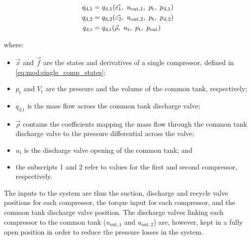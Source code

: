 \begin{equation}
  \begin{split}
    q_{\text{d,1}} & = q_{\text{d,1}}(\vec{\varepsilon_1},\ u_{\text{out},1},\ p_{\text{t}},\ p_{\text{d,1}})\\
    q_{\text{d,2}} & = q_{\text{d,2}}(\vec{\varepsilon_2},\ u_{\text{\text{out}},2},\ p_{\text{t}},\ p_{\text{d,2}})\\
    q_{\text{d,t}} & = q_{\text{d,t}}(\vec{\rho},\ u_{\text{t}},\ p_\text{t},\ p_{\text{out}})
  \end{split}
\end{equation}

where:

\begin{itemize}
  \item $\vec{x}$ and $\vec{f}$ are the states and derivatives of a single compressor, defined in \eqref{eq:mod:single_comp_states};
  \item $p_\text{t}$ and $V_\text{t}$ are the pressure and the volume of the common tank, respectively; 
  \item $q_{\text{d,t}}$ is the mass flow across the common tank discharge valve;
  \item $\vec{\rho}$ contains the coefficients mapping the mass flow through the common tank discharge valve to the pressure differential across the valve;
  \item $u_\text{t}$ is the discharge valve opening of the common tank; and
  \item the subscripts 1 and 2 refer to values for the first and second compressor, respectively.
\end{itemize}

The inputs to the system are thus the suction, discharge and recycle valve positions for each compressor, the torque input for each compressor, and the common tank discharge valve position.
The discharge valves linking each compressor to the common tank ($u_{\text{out},1}$ and $u_{\text{out},2}$) are, however, kept in a fully open position in order to reduce the pressure losses in the system.

